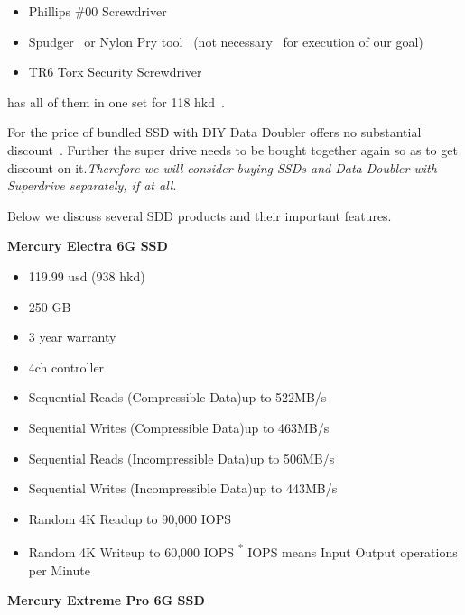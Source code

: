 \begin{itemize}
\item Phillips \#00 Screwdriver~\cite{ifixphscd}
\item Spudger~\cite{ifixspud} or Nylon Pry tool~\cite{owcramreguide,owcpry} (not necessary~\cite{macrumourpry} for execution of our goal)
\item TR6 Torx Security Screwdriver~\cite{ifixtorscd}
\end{itemize}

\macsales has all of them in one set for 118 hkd~\cite{owcalltools}.

For \macsales the price of bundled SSD with DIY Data Doubler offers no substantial discount~\cite{owcddssdbun1,owcddssdbun2}. Further the super drive needs to be bought together again so as to get discount on it.\emph{Therefore we will consider buying SSDs and Data Doubler with Superdrive separately, if at all}.

Below we discuss several SDD products and their important features.

\textbf{\macsales Mercury Electra 6G SSD}

\begin{itemize}
\item 119.99 usd (938 hkd)
\item 250 GB 
\item 3 year warranty
\item 4ch controller
\item Sequential Reads (Compressible Data)up to 522MB/s
\item Sequential Writes (Compressible Data)up to 463MB/s
\item Sequential Reads (Incompressible Data)up to 506MB/s
\item Sequential Writes (Incompressible Data)up to 443MB/s
\item Random 4K Readup to 90,000 IOPS
\item Random 4K Writeup to 60,000 IOPS
\textsuperscript{*} IOPS means Input Output operations per Minute 
\end{itemize}


\textbf{\macsales Mercury Extreme Pro 6G SSD}

